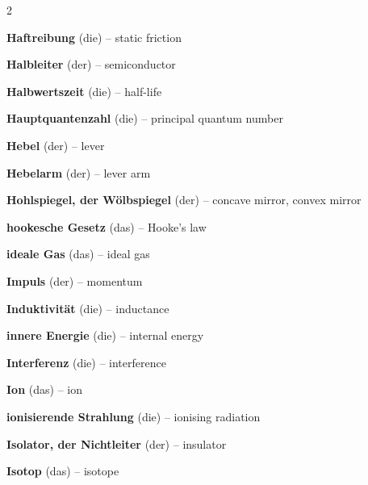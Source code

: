 \begin{multicols}{2}
\par\nopagebreak
\textbf{Haftreibung} (die) -- static friction\dotfill\hyperref[e:67]{\pageref*{e:67}}\par
\textbf{Halbleiter} (der) -- semiconductor\dotfill\hyperref[e:152]{\pageref*{e:152}}\par
\textbf{Halbwertszeit} (die) -- half-life\dotfill\hyperref[e:280]{\pageref*{e:280}}\par
\textbf{Hauptquantenzahl} (die) -- principal quantum number\dotfill\hyperref[e:295]{\pageref*{e:295}}\par
\textbf{Hebel} (der) -- lever\dotfill\hyperref[e:82]{\pageref*{e:82}}\par
\textbf{Hebelarm} (der) -- lever arm\dotfill\hyperref[e:83]{\pageref*{e:83}}\par
\textbf{Hohlspiegel, der Wölbspiegel} (der) -- concave mirror, convex mirror\dotfill\hyperref[e:233]{\pageref*{e:233}}\par
\textbf{hookesche Gesetz} (das) -- Hooke's law\dotfill\hyperref[e:73]{\pageref*{e:73}}\par

\par\nopagebreak
\textbf{ideale Gas} (das) -- ideal gas\dotfill\hyperref[e:140]{\pageref*{e:140}}\par
\textbf{Impuls} (der) -- momentum\dotfill\hyperref[e:79]{\pageref*{e:79}}\par
\textbf{Induktivität} (die) -- inductance\dotfill\hyperref[e:183]{\pageref*{e:183}}\par
\textbf{innere Energie} (die) -- internal energy\dotfill\hyperref[e:118]{\pageref*{e:118}}\par
\textbf{Interferenz} (die) -- interference\dotfill\hyperref[e:209]{\pageref*{e:209}}\par
\textbf{Ion} (das) -- ion\dotfill\hyperref[e:272]{\pageref*{e:272}}\par
\textbf{ionisierende Strahlung} (die) -- ionising radiation\dotfill\hyperref[e:278]{\pageref*{e:278}}\par
\textbf{Isolator, der Nichtleiter} (der) -- insulator\dotfill\hyperref[e:151]{\pageref*{e:151}}\par
\textbf{Isotop} (das) -- isotope\dotfill\hyperref[e:271]{\pageref*{e:271}}\par


\end{multicols}
